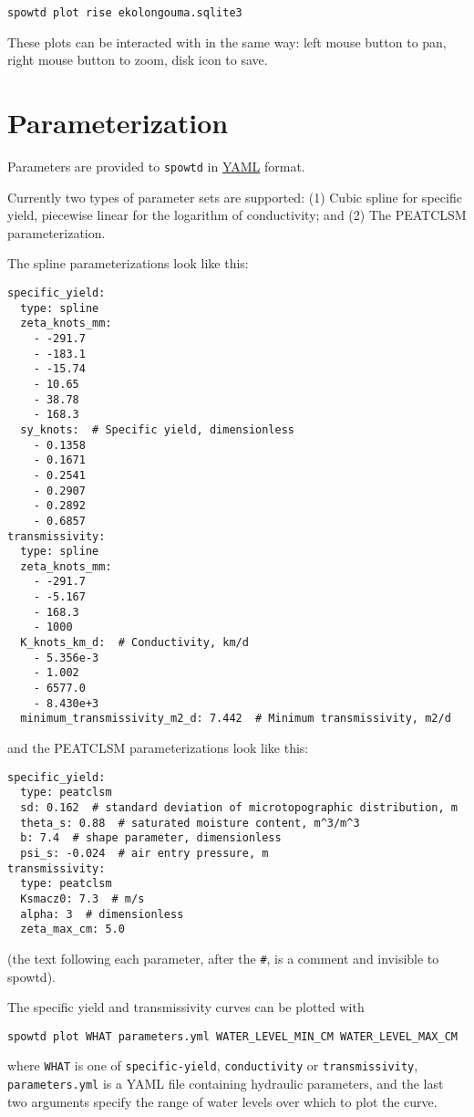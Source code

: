 \documentclass[11pt,a4paper]{article}
\begin{document}
\begin{lstlisting}[frame=single]
spowtd plot rise ekolongouma.sqlite3
\end{lstlisting}
These plots can be interacted with in the same way: left mouse button
to pan, right mouse button to zoom, disk icon to save.

\section{Parameterization}
Parameters are provided to \texttt{spowtd} in
\href{https://yaml.org/}{YAML} format.

Currently two types of parameter sets are supported: (1) Cubic spline
for specific yield, piecewise linear for the logarithm of
conductivity; and (2) The PEATCLSM parameterization.

The spline parameterizations look like this:
\begin{lstlisting}[frame=single]
specific_yield:
  type: spline
  zeta_knots_mm:
    - -291.7
    - -183.1
    - -15.74
    - 10.65
    - 38.78
    - 168.3
  sy_knots:  # Specific yield, dimensionless
    - 0.1358
    - 0.1671
    - 0.2541
    - 0.2907
    - 0.2892
    - 0.6857
transmissivity:
  type: spline
  zeta_knots_mm:
    - -291.7
    - -5.167
    - 168.3
    - 1000
  K_knots_km_d:  # Conductivity, km/d
    - 5.356e-3
    - 1.002
    - 6577.0
    - 8.430e+3
  minimum_transmissivity_m2_d: 7.442  # Minimum transmissivity, m2/d
\end{lstlisting}
and the PEATCLSM parameterizations look like this:
\begin{lstlisting}[frame=single]
specific_yield:
  type: peatclsm
  sd: 0.162  # standard deviation of microtopographic distribution, m
  theta_s: 0.88  # saturated moisture content, m^3/m^3
  b: 7.4  # shape parameter, dimensionless
  psi_s: -0.024  # air entry pressure, m
transmissivity:
  type: peatclsm
  Ksmacz0: 7.3  # m/s
  alpha: 3  # dimensionless
  zeta_max_cm: 5.0
\end{lstlisting}
(the text following each parameter, after the \verb|#|, is a comment
and invisible to spowtd).

The specific yield and transmissivity curves can be plotted with
\begin{lstlisting}[frame=single]
  spowtd plot WHAT parameters.yml WATER_LEVEL_MIN_CM WATER_LEVEL_MAX_CM
\end{lstlisting}
where \texttt{WHAT} is one of \texttt{specific-yield},
\texttt{conductivity} or \texttt{transmissivity},
\texttt{parameters.yml} is a YAML file containing hydraulic
parameters, and the last two arguments specify the range of water
levels over which to plot the curve.
\end{document}
